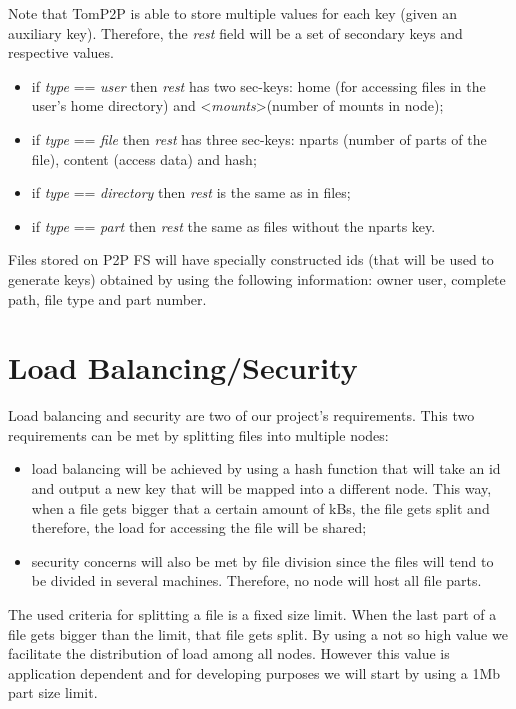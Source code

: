 \documentclass[times,9pt,article]{llncs}
\begin{document}
Note that TomP2P is able to store multiple values for each key (given an 
auxiliary key). Therefore, the \emph{rest} field will be a set of secondary
keys and respective values.

\begin{itemize}
\item if \emph{type} == \emph{user} then \emph{rest} has two sec-keys: home (for accessing files in the user's home directory) and \textless \emph{mounts}\textgreater (number of mounts in node);
\item if \emph{type} == \emph{file} then \emph{rest} has three sec-keys: nparts (number of parts of the file), content (access data) and hash;
\item if \emph{type} == \emph{directory} then \emph{rest} is the same as in files;
\item if \emph{type} == \emph{part} then \emph{rest} the same as files without the nparts key.
\end{itemize}


Files stored on P2P FS will have specially constructed ids (that will be used to
generate keys) obtained by using the following information: owner user, complete 
path, file type and part number.

\section{Load Balancing/Security}

Load balancing and security are two of our project's requirements. This two 
requirements can be met by splitting files into multiple nodes:
\begin{itemize}
\item load balancing will be achieved by using a hash function that will take
an id and output a new key that will be mapped into a different node. This way,
when a file gets bigger that a certain amount of kBs, the file gets split and
therefore, the load for accessing the file will be shared;
\item security concerns will also be met by file division since the files will
tend to be divided in several machines. Therefore, no node will host all file
parts.
\end{itemize}
The used criteria for splitting a file is a fixed size limit. When the last part
of a file gets bigger than the limit, that file gets split. By using a not so high
value we facilitate the distribution of load among all nodes. However this value
is application dependent and for developing purposes we will start by using a
1Mb part size limit.   
\end{document}
